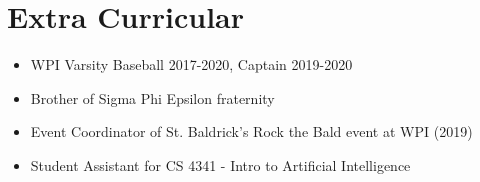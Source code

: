 \documentclass[letterpaper,11pt]{article}
\newcommand{\resumeSubHeadingListStart}{\begin{itemize}[leftmargin=*]}
\newcommand{\resumeSubHeadingListEnd}{\end{itemize}}
\begin{document}
\section{Extra Curricular}
    \resumeSubHeadingListStart
        \item{WPI Varsity Baseball 2017-2020, Captain 2019-2020}
        \item{Brother of Sigma Phi Epsilon fraternity}
        \item{Event Coordinator of St. Baldrick's Rock the Bald event at WPI (2019)}
        \item{Student Assistant for CS 4341 - Intro to Artificial Intelligence}
    \resumeSubHeadingListEnd


\end{document}
